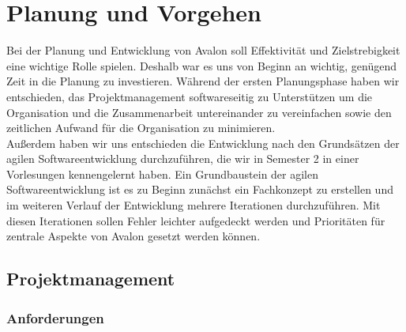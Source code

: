 
\chapter{Planung und Vorgehen}

Bei der Planung und Entwicklung von Avalon soll Effektivität und Zielstrebigkeit eine wichtige Rolle spielen. Deshalb war es uns von Beginn an wichtig, genügend Zeit in die Planung zu investieren. Während der ersten Planungsphase haben wir entschieden, das Projektmanagement softwareseitig zu Unterstützen um die Organisation und die  Zusammenarbeit untereinander zu vereinfachen sowie den zeitlichen Aufwand für die Organisation zu minimieren.\\
 Außerdem haben wir uns entschieden die Entwicklung nach den Grundsätzen der agilen Softwareentwicklung durchzuführen, die wir in Semester 2 in einer Vorlesungen kennengelernt haben. Ein Grundbaustein der agilen Softwareentwicklung ist es zu Beginn zunächst ein Fachkonzept zu erstellen und im weiteren Verlauf der Entwicklung mehrere Iterationen durchzuführen. Mit diesen Iterationen sollen Fehler leichter aufgedeckt werden und Prioritäten für zentrale Aspekte von Avalon gesetzt werden können.

\section{Projektmanagement}

\subsection{Anforderungen}

